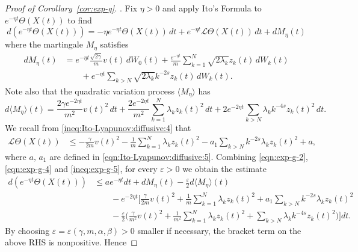 \documentclass[11pt]{amsart}
\theoremstyle{definition}
\renewcommand{\L}{\mathcal{L}}
\newcommand{\la}{\langle}
\newcommand{\ra}{\rangle}
\theoremstyle{definition}
\theoremstyle{plain}
\numberwithin{equation}{section}
\begin{document}
\begin{proof}[Proof of Corollary~\ref{cor:exp-g}]. Fix $\eta>0$ and apply Ito's Formula to $e^{-\eta t}\Theta(X(t))$ to find
\begin{equation}\label{eqn:exp-g-2}
d (e^{-\eta t}\Theta(X(t)))=-\eta e^{-\eta t}\Theta(X(t)) \, dt + e^{-\eta t}\mathcal{L}\Theta(X(t))\, dt + d M_\eta (t)
\end{equation}
where the martingale $M_\eta$ satisfies 
\begin{align*} \label{eqn:exp-g-3}
d M_\eta(t)& =e^{-\eta t}\frac{\sqrt{2\gamma}}{m}v(t)\, dW_0(t)+\frac{e^{-\eta t}}{m}\sum_{k=1}^N \sqrt{2\lambda_k}z_k(t)\, dW_k(t)\\
&\qquad +e^{-\eta t}\sum_{k>N}\sqrt{2\lambda_k}k^{-2s}z_k(t)\, dW_k(t).
\end{align*}
Note also that the quadratic variation process $\la M_\eta \ra$ has 
\begin{equation}\label{eqn:exp-g-4}
d \la M_\eta\ra (t) =\frac{2\gamma e^{-2\eta t} }{m^2}v(t)^2 \, dt +\frac{2 e^{-2\eta t} }{m^2}\sum_{k=1}^N \lambda_k z_k(t)^2 \, dt +2 e^{-2\eta t} \sum_{k>N}\lambda_k k^{-4s}z_k(t)^2\, dt.
\end{equation}
We recall from \eqref{ineq:Ito-Lyapunov:diffusive:4} that 
\begin{equation} \label{ineq:exp-g-5}
\begin{aligned}
\L \Theta(X(t))&\leq -\frac{\gamma}{2m}v(t)^2-\frac{1}{m}\sum_{k=1}^N\lambda_k z_k(t)^2-a_1 \sum_{k>N}k^{-2s}\lambda_kz_k(t)^2+a,
\end{aligned}
\end{equation}
where $a,\,a_1$ are defined in \eqref{eqn:Ito-Lyapunov:diffusive:5}. Combining \eqref{eqn:exp-g-2}, \eqref{eqn:exp-g-4} and \eqref{ineq:exp-g-5}, for every $\varepsilon>0$ we obtain the estimate
\begin{equation*}\label{ineq:exp-g-7}
\begin{aligned}
d\left(e^{-\eta t}\Theta(X(t))\right)  &\leq  ae^{-\eta t}dt + d M_\eta (t)-\frac{\varepsilon}{2}d \la M_\eta\ra(t)\\ 
&\qquad -e^{-2\eta t}\Big[\frac{\gamma}{2m}v(t)^2+\frac{1}{m}\sum_{k=1}^N\lambda_k z_k(t)^2+a_1\sum_{k>N}k^{-2s}\lambda_kz_k(t)^2\\
&\qquad-\frac{\varepsilon}{2}\Big(\frac{\gamma}{m^2}v(t)^2+\frac{1}{m^2}\sum_{k=1}^N \lambda_k z_k(t)^2 +\sum_{k>N}\lambda_k k^{-4s}z_k(t)^2 \Big)\Big]dt.
\end{aligned}
\end{equation*}
By choosing $\varepsilon=\varepsilon(\gamma,m,\alpha,\beta)>0$ smaller if necessary, the bracket term on the above RHS is nonpositive. Hence

\end{proof}
\end{document}
